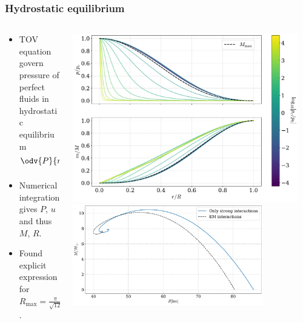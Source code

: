 \documentclass[aspectratio=169]{beamer}
\begin{document}
    \begin{frame}
        \frametitle{Hydrostatic equilibrium}

        \begin{columns}
        \begin{column}{0.4\textwidth}


        \begin{itemize}
            \itemsep 0.6cm
            \item TOV equation govern pressure of perfect fluids in hydrostatic equilibrium\\
            $
            \odv{P}{r} = - \frac{G}{r^2} 
            \frac{\left(u + P\right)
            \left(m + 4 \pi r^3 P\right)}
            {\left(1 - \frac{2Gm}{r} \right)}
            ,
            $
            \item Numerical integration gives $P$, $u$ and thus $M$, $R$.
            \item Found explicit expression for $R_\text{max}= \frac{\pi}{\sqrt{12}} r^0$.
        \end{itemize}

        \end{column}
        \begin{column}{0.5\textwidth}
            \includegraphics[width=0.95\textwidth]{../../scripts/figurer/pion_star/pressure_mass_pion_star.pdf}
            \includegraphics[width=0.8\textwidth]{../../scripts/figurer/pion_star/mass_radius_pion_star_compare.pdf}
        \end{column}
        \end{columns}
    \end{frame}
\end{document}
